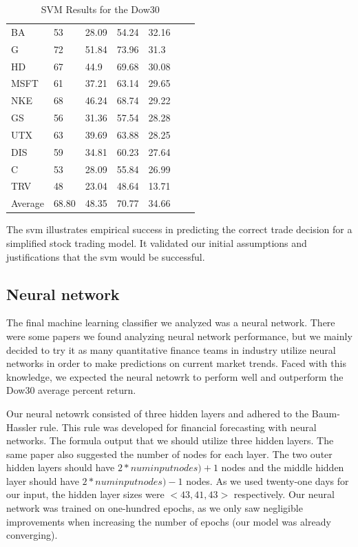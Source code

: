 \documentclass{article}
\begin{document}
\begin{table}[h]
\begin{tabular}{@{}lllllll@{}}
    BA & 53 & 28.09 & 54.24 & 32.16 & \\
    G & 72 & 51.84 & 73.96 & 31.3 & \\
    HD & 67 & 44.9 & 69.68 & 30.08 & \\
    MSFT & 61 & 37.21 & 63.14 & 29.65 & \\
    NKE & 68 & 46.24 & 68.74 & 29.22 & \\
    GS & 56 & 31.36 & 57.54 & 28.28 & \\
    UTX & 63 & 39.69 & 63.88 & 28.25 & \\
    DIS & 59 & 34.81 & 60.23 & 27.64 & \\
    C & 53 & 28.09 & 55.84 & 26.99 & \\
    TRV & 48 & 23.04 & 48.64 & 13.71 & \\ \bottomrule
    Average & 68.80 & 48.35 & 70.77 & 34.66 & \\
  \end{tabular}
  \caption{SVM Results for the Dow30}
  \label{my-label}
\end{table}

The svm illustrates empirical success in predicting the correct trade decision for a simplified stock trading model. It validated our initial assumptions and justifications that the svm would be successful.

\subsection{Neural network}
The final machine learning classifier we analyzed was a neural network. There were some papers we found analyzing neural network performance, but we mainly decided to try it as many quantitative finance teams in industry utilize neural networks in order to make predictions on current market trends. Faced with this knowledge, we expected the neural netowrk to perform well and outperform the Dow30 average percent return.

Our neural netowrk consisted of three hidden layers and adhered to the Baum-Hassler rule. This rule was developed for financial forecasting with neural networks. The formula output that we should utilize three hidden layers. The same paper also suggested the number of nodes for each layer. The two outer hidden layers should have $2*num input nodes) + 1$ nodes and the middle hidden layer should have $2*num input nodes) - 1$ nodes. As we used twenty-one days for our input, the hidden layer sizes were $<43,41,43>$ respectively. Our neural network was trained on one-hundred epochs, as we only saw negligible improvements when increasing the number of epochs (our model was already converging).
\end{document}
